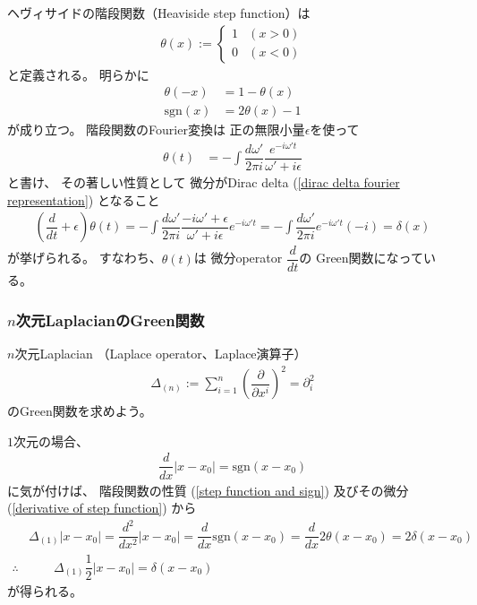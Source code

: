 ヘヴィサイドの階段関数（Heaviside step function）は
\begin{align}
    \theta(x)
    :=
    \begin{cases}
        1 & (x > 0)
    \\
        0 & (x < 0)
    \end{cases}
\label{definition of step function}
\end{align}
と定義される。
明らかに
\begin{subequations}
\begin{align}
    \theta(- x) &= 1 - \theta(x)
\\
    \mathrm{sgn}(x)
    &=
    2 \theta(x) - 1
\label{step function and sign}
\end{align}
\end{subequations}
が成り立つ。
階段関数のFourier変換は
正の無限小量$\epsilon$を使って
\begin{align}
  \theta(t)
  &=
    - \int\dfrac{d \omega'}{2 \pi i}
    \dfrac{e^{- i \omega' t}}{\omega' + i \epsilon}
\label{fourier transformation of step function}
\end{align}
と書け、
その著しい性質として
微分がDirac delta
(\ref{dirac delta fourier representation})
となること
\begin{align}
    \left(
        \dfrac{d}{dt}
        +
        \epsilon
    \right)
    \theta(t)
=
    - \int\dfrac{d \omega'}{2 \pi i}
    \dfrac{
        - i \omega' + \epsilon
    }{\omega' + i \epsilon}
    e^{- i \omega' t}
=
    - \int\dfrac{d \omega'}{2 \pi i}
    e^{- i \omega' t}
    ( - i)
=
    \delta(x)
\label{derivative of step function}
\end{align}
が挙げられる。
すなわち、$\theta(t)$は
微分operator $\dfrac{d}{dt}$の
Green関数になっている。

\subsubsection{$n$次元LaplacianのGreen関数}

$n$次元Laplacian
（Laplace operator、Laplace演算子）
\begin{align}
    \Delta_{(n)}
    :=
    \sum_{i=1}^n
    \left(
        \dfrac{\partial}{\partial x^i}
    \right)^2
    =
    \partial_i^2
\end{align}
のGreen関数を求めよう。

$1$次元の場合、
\begin{align}
    \dfrac{d}{dx}
    |x - x_0|
=
    \mathrm{sgn}
    (x - x_0)
\end{align}
に気が付けば、
階段関数の性質
(\ref{step function and sign})
及びその微分
(\ref{derivative of step function})
から
\begin{subequations}
\begin{align}
    &
    \Delta_{(1)}
    |x - x_0|
=
    \dfrac{d^2}{dx^2}
    |x - x_0|
=
    \dfrac{d}{dx}
    \mathrm{sgn}
    (x - x_0)
=
    \dfrac{d}{dx}
    2 \theta (x - x_0)
=
    2 \delta (x - x_0)
\\\therefore
&\qquad
    \Delta_{(1)}
    \dfrac{1}{2}|x - x_0|
    =
    \delta (x - x_0)
\end{align}
\end{subequations}
が得られる。

